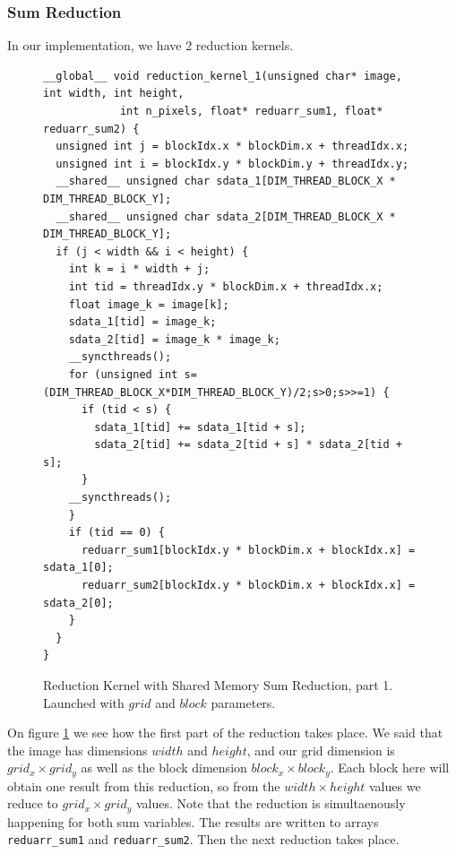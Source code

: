 \documentclass[12pt,reqno]{amsart}
\newcommand{\code}[1]{\texttt{#1}}
\begin{document}
\subsubsection{Sum Reduction}
In our implementation, we have 2 reduction kernels.

\begin{figure}[h]
\centering
\begin{lstlisting}
__global__ void reduction_kernel_1(unsigned char* image, int width, int height, 
            int n_pixels, float* reduarr_sum1, float* reduarr_sum2) { 
  unsigned int j = blockIdx.x * blockDim.x + threadIdx.x;
  unsigned int i = blockIdx.y * blockDim.y + threadIdx.y;
  __shared__ unsigned char sdata_1[DIM_THREAD_BLOCK_X * DIM_THREAD_BLOCK_Y];
  __shared__ unsigned char sdata_2[DIM_THREAD_BLOCK_X * DIM_THREAD_BLOCK_Y];
  if (j < width && i < height) {
    int k = i * width + j;
    int tid = threadIdx.y * blockDim.x + threadIdx.x; 
    float image_k = image[k]; 
    sdata_1[tid] = image_k;
    sdata_2[tid] = image_k * image_k; 
    __syncthreads();
    for (unsigned int s=(DIM_THREAD_BLOCK_X*DIM_THREAD_BLOCK_Y)/2;s>0;s>>=1) {
      if (tid < s) {
        sdata_1[tid] += sdata_1[tid + s];
        sdata_2[tid] += sdata_2[tid + s] * sdata_2[tid + s]; 
      }
    __syncthreads();
    }
    if (tid == 0) {
      reduarr_sum1[blockIdx.y * blockDim.x + blockIdx.x] = sdata_1[0];
      reduarr_sum2[blockIdx.y * blockDim.x + blockIdx.x] = sdata_2[0];
    }		
  }		
}
\end{lstlisting}
\caption{Reduction Kernel with Shared Memory Sum Reduction, part 1. Launched with $grid$ and $block$ parameters.}
\label{fig:reduc_1}

\end{figure}

On figure \ref{fig:reduc_1} we see how the first part of the reduction takes place. We said that the image has dimensions $width$ and $height$, and our grid dimension is $grid_x \times grid_y$ as well as the block dimension $block_x \times block_y$. Each block here will obtain one result from this reduction, so from the $width \times height$ values we reduce to $grid_x \times grid_y$ values. Note that the reduction is simultaenously happening for both sum variables. The results are written to arrays \code{reduarr\_sum1} and \code{reduarr\_sum2}. Then the next reduction takes place.
\end{document}
